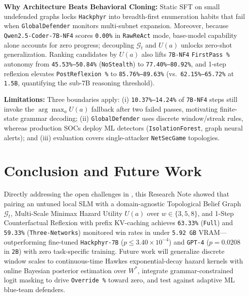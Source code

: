 \documentclass[a4paper,fleqn]{cas-dc}
\begin{document}
\textbf{Why Architecture Beats Behavioral Cloning:} Static SFT on small undefended graphs locks \texttt{Hackphyr} into breadth-first enumeration habits that fail when \texttt{GlobalDefender} monitors multi-subnet expansion. Moreover, because \texttt{Qwen2.5-Coder-7B-NF4} scores \texttt{0.00\%} in \texttt{RawReAct} mode, base-model capability alone accounts for zero progress; decoupling $\mathcal{G}_t$ and $U(a)$ unlocks zero-shot generalization. Ranking candidates by $U(a)$ also lifts \texttt{7B-NF4} \texttt{FirstPass \%} autonomy from \texttt{45.53\%--50.84\%} (\texttt{NoStealth}) to \texttt{77.40\%--80.92\%}, and 1-step reflexion elevates \texttt{PostReflexion \%} to \texttt{85.76\%--89.63\%} (vs.\ \texttt{62.15\%--65.72\%} at \texttt{1.5B}, quantifying the sub-7B reasoning threshold).

\textbf{Limitations:} Three boundaries apply: (i) \texttt{10.37\%--14.24\%} of \texttt{7B-NF4} steps still invoke the $\arg\max_a U(a)$ fallback after two failed passes, motivating finite-state grammar decoding; (ii) \texttt{GlobalDefender} uses discrete window/streak rules, whereas production SOCs deploy ML detectors (\texttt{IsolationForest}, graph neural alerts); and (iii) evaluation covers single-attacker \texttt{NetSecGame} topologies.

\section{Conclusion and Future Work}
\label{sec:conclusion}

Directly addressing the open challenges in \citet{rigaki2026building}, this Research Note showed that pairing an untuned local SLM with a domain-agnostic Topological Belief Graph $\mathcal{G}_t$, Multi-Scale Minimax Hazard Utility $U(a)$ over $w \in \{3, 5, 8\}$, and 1-Step Counterfactual Reflexion with prefix KV-caching achieves \texttt{63.33\%} (\texttt{Full}) and \texttt{59.33\%} (\texttt{Three-Networks}) monitored win rates in under \texttt{5.92 GB} VRAM---outperforming fine-tuned \texttt{Hackphyr-7B} ($p \le 3.40 \times 10^{-4}$) and \texttt{GPT-4} ($p = 0.0208$ in \texttt{2B}) with zero task-specific training. Future work will generalize discrete window scales to continuous-time Hawkes exponential-decay hazard kernels with online Bayesian posterior estimation over $W^*$, integrate grammar-constrained logit masking to drive \texttt{Override~\%} toward zero, and test against adaptive ML blue-team defenders.

\printcredits
\end{document}
